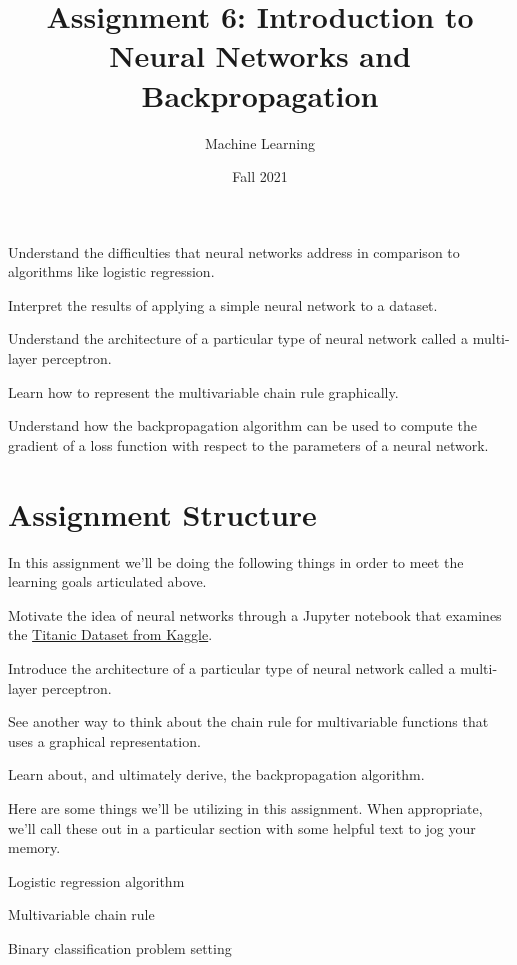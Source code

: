 \documentclass[assignment06_Solutions]{subfiles}
\title{Assignment 6: Introduction to Neural Networks and Backpropagation}
\author{Machine Learning}
\date{Fall 2021}
\begin{document}
\maketitle
\thispagestyle{firstpage}


\begin{learningobjectives}
\bi
\item Understand the difficulties that neural networks address in comparison to algorithms like logistic regression.
\item Interpret the results of applying a simple neural network to a dataset.
\item Understand the architecture of a particular type of neural network called a multi-layer perceptron.
\item Learn how to represent the multivariable chain rule graphically.
\item Understand how the backpropagation algorithm can be used to compute the gradient of a loss function with respect to the parameters of a neural network.
\ei
\end{learningobjectives}


\section{Assignment Structure}
In this assignment we'll be doing the following things in order to meet the learning goals articulated above.
\be
\item Motivate the idea of neural networks through a Jupyter notebook that examines the \href{https://www.kaggle.com/c/titanic}{Titanic Dataset from Kaggle}.
\item Introduce the architecture of a particular type of neural network called a multi-layer perceptron.
\item See another way to think about the chain rule for multivariable functions that uses a graphical representation.
\item Learn about, and ultimately derive, the backpropagation algorithm.
\ee

\begin{priorknowledge}
Here are some things we'll be utilizing in this assignment.  When appropriate, we'll call these out in a particular section with some helpful text to jog your memory.
\bi
\item Logistic regression algorithm
\item Multivariable chain rule
\item Binary classification problem setting
\ei
\end{priorknowledge}
\end{document}
